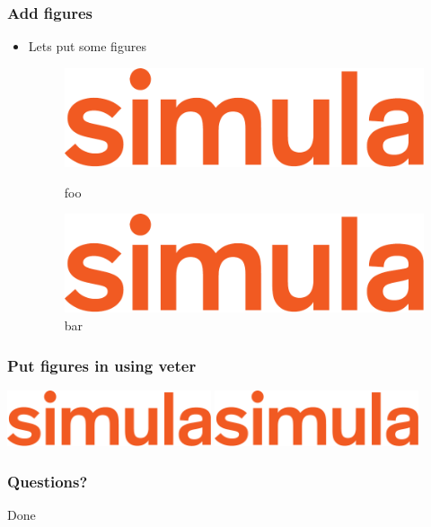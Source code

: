 \documentclass[mathserif, aspectratio=169]{beamer}
\begin{document}
\begin{frame}
  \frametitle{Add figures}
  \begin{itemize}
  \item Lets put some figures

    \begin{figure}
    \begin{minipage}{.45\textwidth}
      \includegraphics[width=\linewidth]{simula_logo_main_RGB}
      \caption{foo}
    \end{minipage}\hfill
    \begin{minipage}{.45\textwidth}
      \includegraphics[width=\linewidth]{simula_logo_main_RGB}
      \caption{bar}
    \end{minipage}
    \end{figure}
  \end{itemize}
\end{frame}


\begin{frame}
  \frametitle{Put figures in using veter}

  \begin{center}
  \includegraphics[width=0.45\textwidth]{simula_logo_main_RGB}
  \includegraphics[width=0.45\textwidth]{simula_logo_main_RGB}
  \end{center}

\end{frame}
        

\logopage
\begin{frame}[fragile]
  \frametitle{Questions?}
  Done
\end{frame}
\end{document}
